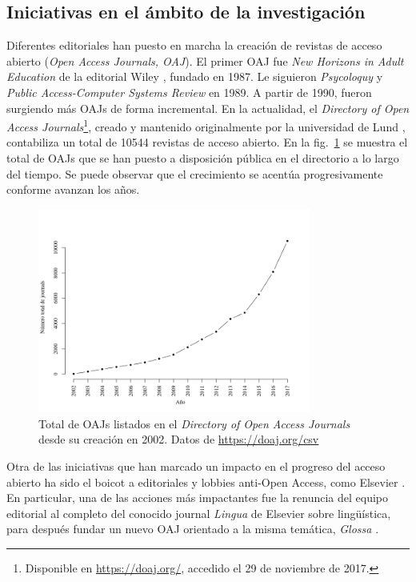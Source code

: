 \subsection{Iniciativas en el ámbito de la investigación}

Diferentes editoriales han puesto en marcha la creación de revistas de acceso abierto (\textit{Open Access Journals, OAJ}). El primer OAJ fue \textit{New Horizons in Adult Education} de la editorial Wiley \cite{earlyoaj}, fundado en 1987. Le siguieron \textit{Psycoloquy} y \textit{Public Access-Computer Systems Review} en 1989. A partir de 1990, fueron surgiendo más OAJs de forma incremental. En la actualidad, el \textit{Directory of Open Access Journals}\footnote{Disponible en \url{https://doaj.org/}, accedido el 29 de noviembre de 2017.}, creado y mantenido originalmente por la universidad de Lund \cite{nordic}, contabiliza un total de 10544 revistas de acceso abierto. En la fig.~\ref{fig:doaj} se muestra el total de OAJs que se han puesto a disposición pública en el directorio a lo largo del tiempo. Se puede observar que el crecimiento se acentúa progresivamente conforme avanzan los años.

\begin{figure}[htbp]
  \centering
  \includegraphics[width=0.8\textwidth]{doaj_years.png}
  \caption{\label{fig:doaj}Total de OAJs listados en el \textit{Directory of Open Access Journals} desde su creación en 2002. Datos de \url{https://doaj.org/csv}}

\end{figure}

\label{sec:boicot}
Otra de las iniciativas que han marcado un impacto en el progreso del acceso abierto ha sido el boicot a editoriales y lobbies anti-Open Access, como Elsevier \cite{costknowledge}. En particular, una de las acciones más impactantes fue la renuncia del equipo editorial al completo del conocido journal \textit{Lingua} de Elsevier sobre lingüística, para después fundar un nuevo OAJ orientado a la misma temática, \textit{Glossa} \cite{linguaglossa}.

